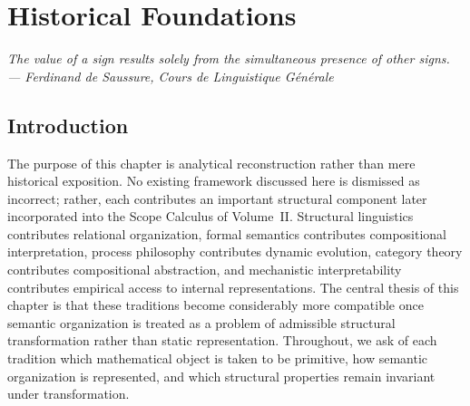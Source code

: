 \documentclass[11pt,twoside,openright]{book}
\numberwithin{equation}{chapter}
\theoremstyle{definition}
\theoremstyle{plain}
\theoremstyle{remark}
\theoremstyle{definition}
\begin{document}
\chapter{Historical Foundations}
\label{ch:historical-foundations}

\begin{center}
\end{center}

\vspace{1em}
\begin{flushright}\itshape
The value of a sign results solely from the simultaneous presence of
other signs.\\
\upshape --- Ferdinand de Saussure, \emph{Cours de Linguistique G\'en\'erale}
\end{flushright}
\vspace{1em}

\section{Introduction}

The purpose of this chapter is analytical reconstruction rather than mere
historical exposition. No existing framework discussed here is dismissed
as incorrect; rather, each contributes an important structural component
later incorporated into the Scope Calculus of Volume~II. Structural
linguistics contributes relational organization, formal semantics
contributes compositional interpretation, process philosophy contributes
dynamic evolution, category theory contributes compositional abstraction,
and mechanistic interpretability contributes empirical access to internal
representations. The central thesis of this chapter is that these
traditions become considerably more compatible once semantic organization
is treated as a problem of admissible structural transformation rather
than static representation. Throughout, we ask of each tradition which
mathematical object is taken to be primitive, how semantic organization
is represented, and which structural properties remain invariant under
transformation.
\end{document}
